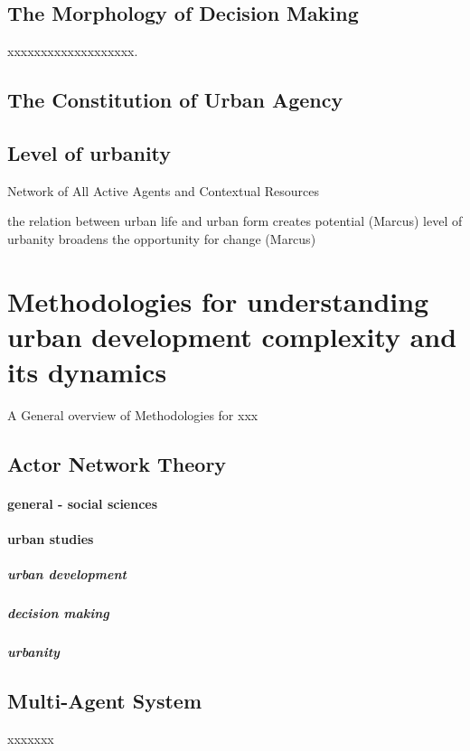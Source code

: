 \documentclass[11pt]{report}
\begin{document}
\subsection{The Morphology of Decision Making}

xxxxxxxxxxxxxxxxxxx.

\subsection{The Constitution of Urban Agency}


\subsection{Level of urbanity}

Network of All Active Agents and Contextual Resources

the relation between urban life and urban form creates potential (Marcus)
level of urbanity broadens the opportunity for change (Marcus)

\section{Methodologies for understanding urban development complexity and its dynamics}

A General overview of Methodologies for xxx

\subsection{Actor Network Theory}

\paragraph{general - social sciences}

\paragraph{urban studies}

\subparagraph{urban development}

\subparagraph{decision making}

\subparagraph{urbanity}


\subsection{Multi-Agent System}

xxxxxxx
\end{document}
